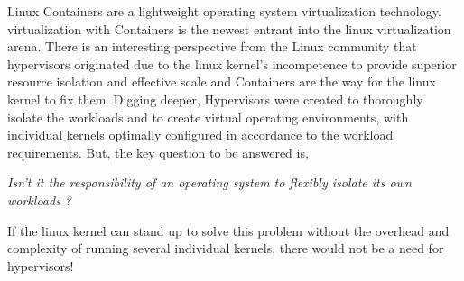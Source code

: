 





Linux Containers are a lightweight operating system virtualization technology. virtualization with Containers is the newest entrant into the linux virtualization arena. There is an interesting perspective from the Linux community that hypervisors originated due to the linux kernel's incompetence to provide superior resource isolation and effective scale \cite{linux_incompetent} and Containers are the way for the linux kernel to fix them. Digging deeper, Hypervisors were created to thoroughly isolate the workloads and to create virtual operating environments, with individual kernels optimally configured in accordance to the workload requirements. But, the key question to be answered is,


\emph{Isn't it the responsibility of an operating system to flexibly isolate its own workloads ?}



If the linux kernel can stand up to solve this problem without the overhead and complexity of running several individual kernels, there would not be a need for hypervisors!



